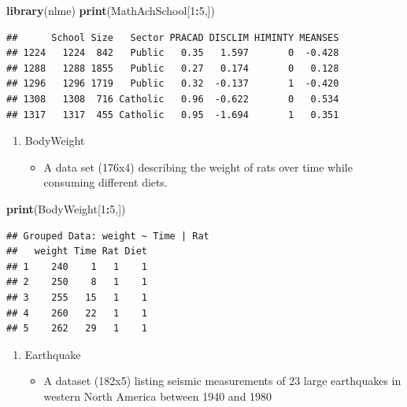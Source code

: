 \documentclass[]{book}
\newenvironment{Shaded}{\begin{snugshade}}{\end{snugshade}}
\newcommand{\DecValTok}[1]{\textcolor[rgb]{0.00,0.00,0.81}{#1}}
\newcommand{\KeywordTok}[1]{\textcolor[rgb]{0.13,0.29,0.53}{\textbf{#1}}}
\newcommand{\NormalTok}[1]{#1}
\newcommand{\OperatorTok}[1]{\textcolor[rgb]{0.81,0.36,0.00}{\textbf{#1}}}
\providecommand{\tightlist}{%
  \setlength{\itemsep}{0pt}\setlength{\parskip}{0pt}}
\begin{document}
\begin{Shaded}
\begin{Highlighting}[]
\KeywordTok{library}\NormalTok{(nlme)}
\KeywordTok{print}\NormalTok{(MathAchSchool[}\DecValTok{1}\OperatorTok{:}\DecValTok{5}\NormalTok{,])}
\end{Highlighting}
\end{Shaded}

\begin{verbatim}
##      School Size   Sector PRACAD DISCLIM HIMINTY MEANSES
## 1224   1224  842   Public   0.35   1.597       0  -0.428
## 1288   1288 1855   Public   0.27   0.174       0   0.128
## 1296   1296 1719   Public   0.32  -0.137       1  -0.420
## 1308   1308  716 Catholic   0.96  -0.622       0   0.534
## 1317   1317  455 Catholic   0.95  -1.694       1   0.351
\end{verbatim}

\begin{enumerate}
\def\labelenumi{\arabic{enumi}.}
\setcounter{enumi}{1}
\tightlist
\item
  BodyWeight

  \begin{itemize}
  \tightlist
  \item
    A data set (176x4) describing the weight of rats over time while consuming different diets.
  \end{itemize}
\end{enumerate}

\begin{Shaded}
\begin{Highlighting}[]
\KeywordTok{print}\NormalTok{(BodyWeight[}\DecValTok{1}\OperatorTok{:}\DecValTok{5}\NormalTok{,])}
\end{Highlighting}
\end{Shaded}

\begin{verbatim}
## Grouped Data: weight ~ Time | Rat
##   weight Time Rat Diet
## 1    240    1   1    1
## 2    250    8   1    1
## 3    255   15   1    1
## 4    260   22   1    1
## 5    262   29   1    1
\end{verbatim}

\begin{enumerate}
\def\labelenumi{\arabic{enumi}.}
\setcounter{enumi}{2}
\tightlist
\item
  Earthquake

  \begin{itemize}
  \tightlist
  \item
    A dataset (182x5) listing seismic measurements of 23 large earthquakes in western North America between 1940 and 1980
  \end{itemize}
\end{enumerate}
\end{document}
